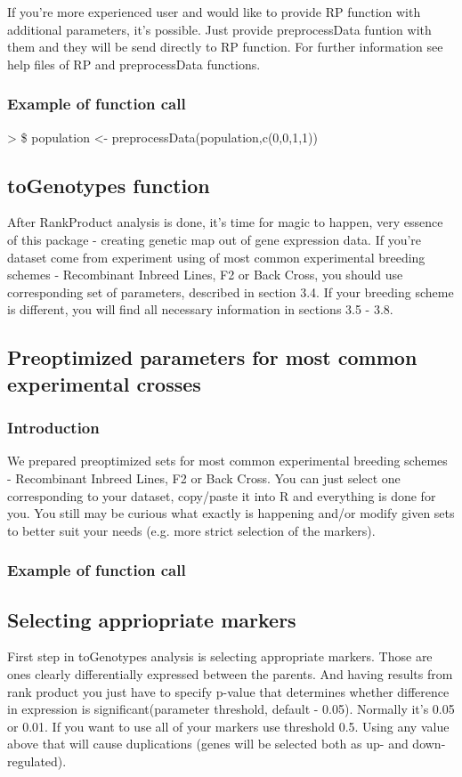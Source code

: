 \documentclass{article}
\begin{document}
{\noindent}If you're more experienced user and would like to provide RP function with additional parameters, it's possible. Just provide preprocessData funtion with them and they will be send directly to RP function. For further information see help files of RP and preprocessData functions.
\subsubsection{Example of function call}
>  \$ population <- preprocessData(population,c(0,0,1,1))
\subsection{toGenotypes function}
After RankProduct analysis is done, it's time for magic to happen,  very essence of this package - creating genetic map out of gene expression data. If you're dataset come from experiment using of most common experimental breeding schemes - Recombinant Inbreed Lines, F2 or Back Cross, you should use corresponding set of parameters, described in section 3.4. If your breeding scheme is different, you will find all necessary information in sections 3.5 - 3.8.
\subsection{Preoptimized parameters for most common experimental crosses}
\subsubsection{Introduction}
We prepared preoptimized sets for most common experimental breeding schemes - Recombinant Inbreed Lines, F2 or Back Cross. You can just select one corresponding to your dataset, copy/paste it into R and everything is done for you. You still may be curious what exactly is happening and/or modify given sets to better suit your needs (e.g. more strict selection of the markers).
\subsubsection{Example of function call}
\subsection{Selecting appriopriate markers}
First step in toGenotypes analysis is selecting appropriate markers. Those are ones clearly differentially expressed between the parents. And having results from rank product you just have to specify p-value that determines whether difference in expression is significant(parameter threshold, default - 0.05). Normally it's 0.05 or 0.01. If you want to use all of your markers use threshold 0.5. Using any value above that will cause duplications (genes will be selected both as up- and down-regulated).
\end{document}
